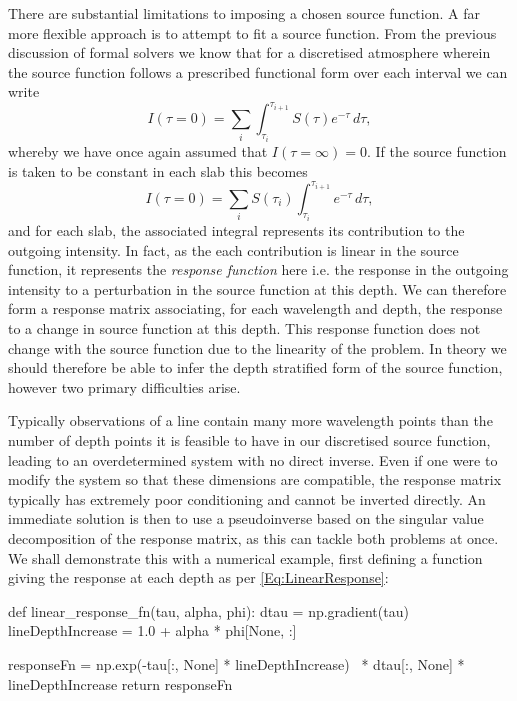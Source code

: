 There are substantial limitations to imposing a chosen source function.
A far more flexible approach is to attempt to fit a source function.
From the previous discussion of formal solvers we know that for a discretised atmosphere wherein the source function follows a prescribed functional form over each interval we can write
\begin{equation}
    I(\tau=0) = \sum_i \int_{\tau_i}^{\tau_{i+1}} S(\tau)e^{-\tau}\, d\tau,
\end{equation}
whereby we have once again assumed that $I(\tau=\infty)=0$.
If the source function is taken to be constant in each slab this becomes
\begin{equation}\label{Eq:LinearResponse}
    I(\tau=0) = \sum_i S(\tau_i) \int_{\tau_i}^{\tau_{i+1}} e^{-\tau}\, d\tau,
\end{equation}
and for each slab, the associated integral represents its contribution to the outgoing intensity. In fact, as the each contribution is linear in the source function, it represents the \emph{response function} here i.e. the response in the outgoing intensity to a perturbation in the source function at this depth.
We can therefore form a response matrix associating, for each wavelength and depth, the response to a change in source function at this depth.
This response function does not change with the source function due to the linearity of the problem.
In theory we should therefore be able to infer the depth stratified form of the source function, however two primary difficulties arise.

Typically observations of a line contain many more wavelength points than the number of depth points it is feasible to have in our discretised source function, leading to an overdetermined system with no direct inverse.
Even if one were to modify the system so that these dimensions are compatible, the response matrix typically has extremely poor conditioning and cannot be inverted directly.
An immediate solution is then to use a pseudoinverse based on the singular value decomposition of the response matrix, as this can tackle both problems at once.
We shall demonstrate this with a numerical example, first defining a function giving the response at each depth as per \eqref{Eq:LinearResponse}:

\begin{pyblock}[Radynversion]
def linear_response_fn(tau, alpha, phi):
    dtau = np.gradient(tau)
    lineDepthIncrease = 1.0 + alpha * phi[None, :]

    responseFn = np.exp(-tau[:, None] * lineDepthIncrease) \
                  * dtau[:, None] * lineDepthIncrease
    return responseFn
\end{pyblock}

